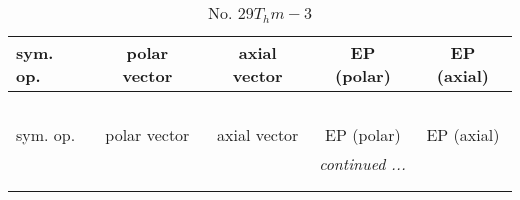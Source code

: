 \documentclass[fleqn,10pt,landscape]{jsarticle}
\begin{document}
\newpage
\begin{center}
\renewcommand{\arraystretch}{1.3}
\begin{longtable}{lcccc}
\caption{No. 29\quad$T_{h}$\quad$m-3$\quad[ cubic ]}
 \\
 \hline \hline
sym. op. & polar vector & axial vector & EP (polar) & EP (axial) \\ \hline \endfirsthead

\multicolumn{4}{l}{\tablename\ \thetable{}} \\
 \hline \hline
sym. op. & polar vector & axial vector & EP (polar) & EP (axial) \\ \hline \endhead

 \hline \hline
\multicolumn{4}{r}{\footnotesize\it continued ...} \\ \endfoot

 \hline \hline
\multicolumn{4}{r}{} \\ \endlastfoot


\end{longtable}
\end{center}
\end{document}
